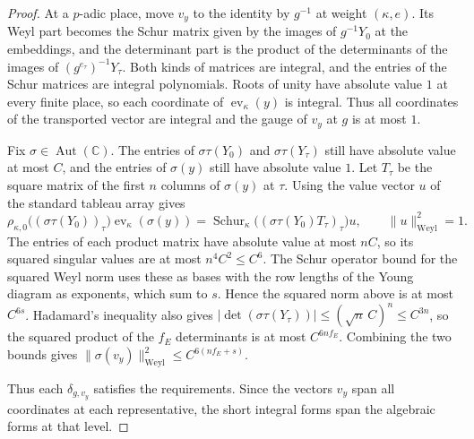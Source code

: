 \begin{proof}
At a $p$-adic place, move $v_y$ to the identity by $g^{-1}$ at weight $(\kappa,e)$. Its Weyl part becomes the Schur matrix given by the images of $g^{-1}Y_0$ at the embeddings, and the determinant part is the product of the determinants of the images of $(g^{e_\tau})^{-1}Y_\tau$. Both kinds of matrices are integral, and the entries of the Schur matrices are integral polynomials. Roots of unity have absolute value $1$ at every finite place, so each coordinate of $\operatorname{ev}_\kappa(y)$ is integral. Thus all coordinates of the transported vector are integral and the gauge of $v_y$ at $g$ is at most $1$.

Fix $\sigma\in\operatorname{Aut}(\mathbb C)$. The entries of $\sigma\tau(Y_0)$ and $\sigma\tau(Y_\tau)$ still have absolute value at most $C$, and the entries of $\sigma(y)$ still have absolute value $1$. Let $T_\tau$ be the square matrix of the first $n$ columns of $\sigma(y)$ at $\tau$. Using the value vector $u$ of the standard tableau array gives
\[
 \rho_{\kappa,0}\bigl((\sigma\tau(Y_0))_\tau\bigr)
       \operatorname{ev}_\kappa(\sigma(y))
 =\operatorname{Schur}_\kappa\bigl((\sigma\tau(Y_0)T_\tau)_\tau\bigr)u,
 \qquad \|u\|_{\mathrm{Weyl}}^2=1.
\]
The entries of each product matrix have absolute value at most $nC$, so its squared singular values are at most $n^4C^2\le C^6$. The Schur operator bound for the squared Weyl norm uses these as bases with the row lengths of the Young diagram as exponents, which sum to $s$. Hence the squared norm above is at most $C^{6s}$. Hadamard's inequality also gives
$|\det(\sigma\tau(Y_\tau))|\le(\sqrt n\,C)^n\le C^{3n}$, so the squared product of the $f_E$ determinants is at most $C^{6nf_E}$. Combining the two bounds gives $\|\sigma(v_y)\|^2_{\mathrm{Weyl}}\le C^{6(nf_E+s)}$.

Thus each $\delta_{g,v_y}$ satisfies the requirements. Since the vectors $v_y$ span all coordinates at each representative, the short integral forms span the algebraic forms at that level.
\end{proof}

